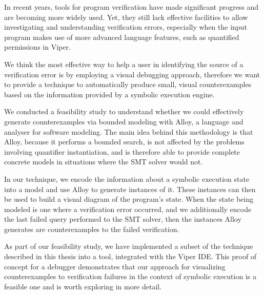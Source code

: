 
In recent years, tools for program verification have made significant progress
and are becoming more widely used. Yet, they still lack effective facilities to
allow investigating and understanding verification errors, especially when the
input program makes use of more advanced language features, such as quantified
permissions in Viper.

We think the most effective way to help a user in identifying the source of
a verification error is by employing a visual debugging approach, therefore we
want to provide a technique to automatically produce small, visual
counterexamples based on the information provided by a symbolic execution
engine.

We conducted a feasibility study to understand whether we could effectively
generate counterexamples via bounded modeling with Alloy, a language and
analyser for software modeling. The main idea behind this methodology is that
Alloy, because it performs a bounded search, is not affected by the problems
involving quantifier instantiation, and is therefore able to provide complete
concrete models in situations where the SMT solver would not.

In our technique, we encode the information about a symbolic execution state
into a model and use Alloy to generate instances of it. These instances
can then be used to build a visual diagram of the program's state. When the
state being modeled is one where a verification error occurred, and we
additionally encode the last failed query performed to the SMT solver, then the
instances Alloy generates are counterexamples to the failed verification.

As part of our feasibility study, we have implemented a subset of the technique
described in this thesis into a tool, integrated with the Viper IDE. This proof
of concept for a debugger demonstrates that our approach for visualizing
counterexamples to verification failures in the context of symbolic execution is
a feasible one and is worth exploring in more detail.
